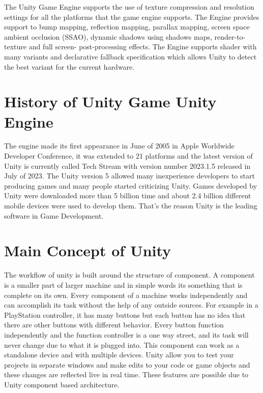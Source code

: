 The Unity Game Engine supports the use of texture compression and resolution settings for all the platforms that the game engine supports. The Engine provides support to bump mapping, reflection mapping, parallax mapping, screen space ambient occlusion (SSAO), dynamic shadows using shadows maps, render-to-texture and full screen- post-processing effects.
The Engine supports shader with many variants and declarative fallback specification which allows Unity to detect the best variant for the current hardware.

\section{History of Unity Game Unity Engine}
The engine made its first appearance in June of 2005 in Apple Worldwide Developer Conference, it was extended to 21 platforms and the latest version of Unity is currently called Tech Stream with version number 2023.1.5 released in July of 2023.
The Unity version 5 allowed many inexperience developers to start producing games and many people started criticizing Unity. Games developed by Unity were downloaded more than 5 billion time and about 2.4 billion different mobile devices were used to develop them.
That’s the reason Unity is the leading software in Game Development.

\section{Main Concept of Unity}
The workflow of unity is built around the structure of component. A component is a smaller part of larger machine and in simple words its something that is complete on its own. Every component of a machine works independently and can accomplish its task without the help of any outside sources.
For example in a PlayStation controller, it has many buttons but each button has no idea that there are other buttons with different behavior. Every button function independently and the function controller is a one way street, and its task will never change due to what it is plugged into. This component can work as a standalone device and with multiple devices.
Unity allow you to test your projects in separate windows and make edits to your code or game objects and these changes are reflected live in real time. These features are possible due to Unity component based architecture.

